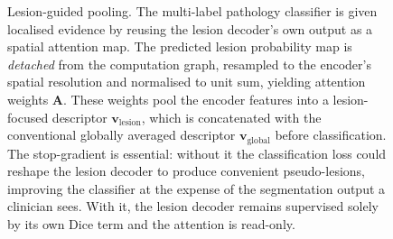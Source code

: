 \begin{figure}[htbp]
{}
\caption{Lesion-guided pooling. The multi-label pathology classifier is given localised evidence
by reusing the lesion decoder's own output as a spatial attention map. The predicted lesion
probability map is \emph{detached} from the computation graph, resampled to the encoder's spatial
resolution and normalised to unit sum, yielding attention weights $\mathbf{A}$. These weights
pool the encoder features into a lesion-focused descriptor
$\mathbf{v}_{\text{lesion}}$, which is concatenated with the conventional globally averaged
descriptor $\mathbf{v}_{\text{global}}$ before classification. The stop-gradient is essential:
without it the classification loss could reshape the lesion decoder to produce convenient
pseudo-lesions, improving the classifier at the expense of the segmentation output a clinician
sees. With it, the lesion decoder remains supervised solely by its own Dice term and the
attention is read-only.}\label{fig:pooling}
\end{figure}

